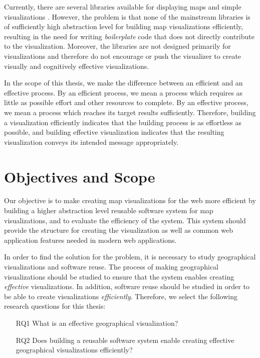 Currently, there are several libraries available for displaying maps and simple visualizations \citep{google_maps_2005,agafonkin_leaflet_2011,metacarta_openlayers_2006}. However, the problem is that none of the mainstream libraries is of sufficiently high abstraction level for building map visualizations efficiently, resulting in the need for writing \emph{boilerplate} code that does not directly contribute to the visualization. Moreover, the libraries are not designed primarily for visualizations and therefore do not encourage or push the visualizer to create visually and cognitively effective visualizations.

In the scope of this thesis, we make the difference between an efficient and an effective process. By an efficient process, we mean a process which requires as little as possible effort and other resources to complete. By an effective process, we mean a process which reaches its target results sufficiently. Therefore, building a visualization efficiently indicates that the building process is as effortless as possible, and building effective visualization indicates that the resulting visualization conveys its intended message appropriately. 

\section{Objectives and Scope}

Our objective is to make creating map visualizations for the web more efficient by building a higher abstraction level reusable software system for map visualizations, and to evaluate the efficiency of the system. This system should provide the structure for creating the visualization as well as common web application features needed in modern web applications.

In order to find the solution for the problem, it is necessary to study geographical visualizations and software reuse. The process of making geographical visualizations should be studied to ensure that the system enables creating \emph{effective} visualizations. In addition, software reuse should be studied in order to be able to create visualizations \emph{efficiently}. Therefore, we select the following research questions for this thesis:

\begin{enumerate}
	\item[RQ1] What is an effective geographical visualization? 
	\item[RQ2] Does building a reusable software system enable creating effective geographical visualizations efficiently?
\end{enumerate}

